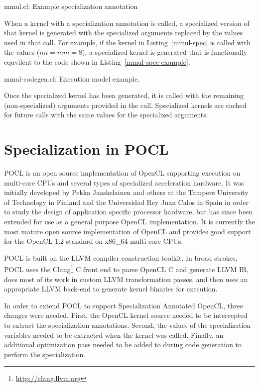 \documentclass{acm_proc_article-sp}
\newcommand{\includecode}[2][C]{
    }
\begin{document}
\begin{listing}
\includecode{mmul-spec.cl}
\caption{mmul.cl: Example specialization annotation}
\label{mmul-spec}
\end{listing}

When a kernel with a specialization annotation is called, a specialized version
of that kernel is generated with the specialized arguments replaced by the values
used in that call. For example, if the kernel in Listing~\ref{mmul-spec} is called
with the values ($nn = mm = 8$), a specialized kernel is generated that is
functionally equvilent to the code shown in Listing~\ref{mmul-spec-example}.

\begin{listing}
\includecode{mmul-spec-example.cl}
\caption{mmul-codegen.cl: Execution model example.}
\label{mmul-spec-example}
\end{listing}

Once the specialized kernel has been generated, it is called with the remaining
(non-specialized) arguments provided in the call. Specialized kernels are
cached for future calls with the same values for the specialized arguments.

\section{Specialization in POCL}
\label{pocl-spec}

POCL is an open source implementation of OpenCL supporting execution on
multi-core CPUs and several types of specialized acceleration hardware. It was
initially developed\cite{Jaaskelainen:2010:POCL} by Pekka Jaaskelainen and
others at the Tampere University of Technology in Finland and the Universidad
Rey Juan Calos in Spain in order to study the design of application specific
processor hardware, but has since been extended for use as a general purpose
OpenCL implementation. It is currently the most mature open source
implementation of OpenCL and provides good support for the OpenCL 1.2 standard
on x86\_64 multi-core CPUs.

POCL is built on the LLVM\cite{Lattner:2002:LLVM} compiler construction
toolkit. In broad strokes, POCL uses the
Clang\footnote{\url{http://clang.llvm.org}} C front end to parse OpenCL C and
generate LLVM IR, does most of its work in custom LLVM transformation passes,
and then uses an appropriate LLVM back-end to generate kernel binaries for
execution.

In order to extend POCL to support Specialization Annotated OpenCL, three
changes were needed. First, the OpenCL kernel source needed to be intercepted
to extract the specialization annotations. Second, the values of the
specialization variables needed to be extracted when the kernel was called.
Finally, an additional optimization pass needed to be added to during code
generation to perform the specialization.
\end{document}

